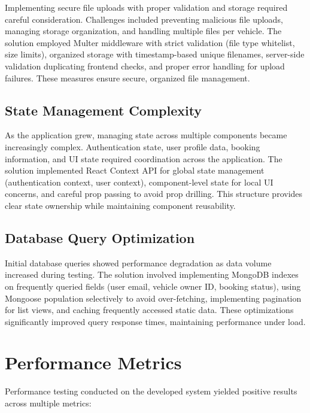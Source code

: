 \documentclass[12pt,a4paper]{report}
\begin{document}
	Implementing secure file uploads with proper validation and storage required careful consideration. Challenges included preventing malicious file uploads, managing storage organization, and handling multiple files per vehicle. The solution employed Multer middleware with strict validation (file type whitelist, size limits), organized storage with timestamp-based unique filenames, server-side validation duplicating frontend checks, and proper error handling for upload failures. These measures ensure secure, organized file management.
	
	\subsection{State Management Complexity}
	
	As the application grew, managing state across multiple components became increasingly complex. Authentication state, user profile data, booking information, and UI state required coordination across the application. The solution implemented React Context API for global state management (authentication context, user context), component-level state for local UI concerns, and careful prop passing to avoid prop drilling. This structure provides clear state ownership while maintaining component reusability.
	
	\subsection{Database Query Optimization}
	
	Initial database queries showed performance degradation as data volume increased during testing. The solution involved implementing MongoDB indexes on frequently queried fields (user email, vehicle owner ID, booking status), using Mongoose population selectively to avoid over-fetching, implementing pagination for list views, and caching frequently accessed static data. These optimizations significantly improved query response times, maintaining performance under load.
	
	\section{Performance Metrics}
	
	Performance testing conducted on the developed system yielded positive results across multiple metrics:
	
\end{document}

